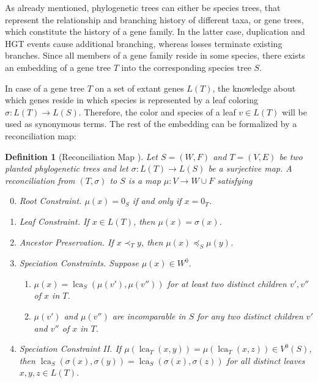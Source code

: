 \documentclass[hidelinks,11pt]{scrreprt}
\DeclareMathOperator{\lca}{lca}
\newtheorem{definition}[theorem]{Definition}
\begin{document}
As already mentioned, phylogenetic trees can either be species trees, that represent the relationship and branching history of different taxa, or gene trees, which constitute the history of a gene family. In the latter case, duplication and HGT events cause additional branching, whereas losses terminate existing branches.
Since all members of a gene family reside in some species, there exists an embedding of a gene tree $T$ into the corresponding species tree $S$.

In case of a gene tree $T$ on a set of extant genes $L(T)$, the knowledge about which genes reside in which species is represented by a leaf coloring $\sigma\colon L(T) \to L(S)$. Therefore, the color and species of a leaf $v\in L(T)$ will be used as synonymous terms. The rest of the embedding can be formalized by a reconciliation map:

\begin{definition}[Reconciliation Map {\citep[cf.][]{geiss2020c,stadler2020}}]
	\label{def:reconc_map}
	Let $S=(W,F)$ and $T=(V,E)$ be two planted phylogenetic trees and let $\sigma\colon L(T) \to L(S)$ be a surjective map. A reconciliation from $(T,\sigma)$ to $S$ is a map $\mu\colon V \to W \cup F$ satisfying
	\begin{enumerate}[label=\emph{(R\arabic*)}, ref=\emph{(R\arabic*)}, itemsep=0.2cm, topsep=0.2cm, parsep=0cm]
		\setcounter{enumi}{-1}
		\item \emph{Root Constraint.} $\mu(x) = 0_S$ if and only if $x=0_T$.
		\item \emph{Leaf Constraint.} If $x \in L(T)$, then $\mu(x)=\sigma(x)$.
		\item \emph{Ancestor Preservation.} If $x \prec_T y$, then $\mu(x) \preceq_S \mu(y)$.
		\item \emph{Speciation Constraints.} Suppose $\mu(x) \in W^0$.
		\begin{enumerate}[label=(\roman*), itemsep=0.2cm, topsep=0.2cm, parsep=0cm]
			\item $\mu(x)=\lca_S(\mu(v'),\mu(v''))$ for at least two distinct children $v',v''$ of $x$ in $T$.
			\item $\mu(v')$ and $\mu(v'')$ are incomparable in $S$ for any two distinct children $v'$ and $v''$ of $x$ in $T$.
		\end{enumerate}
		\item \emph{Speciation Constraint II.} If $\mu(\lca_T(x,y))=\mu(\lca_T(x,z))\in V^0(S)$, then \newline $\lca_S(\sigma(x),\sigma(y))=\lca_S(\sigma(x),\sigma(z))$ for all distinct leaves $x,y,z\in L(T)$.
	\end{enumerate}
\end{definition}
\end{document}
